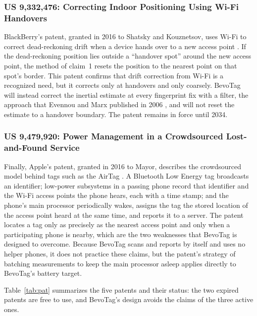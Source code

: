 \documentclass[12pt,letterpaper]{article}
\begin{document}
\subsubsection{US 9,332,476: Correcting Indoor Positioning Using Wi-Fi Handovers}
BlackBerry's patent, granted in 2016 to Shatsky and Kouznetsov, uses Wi-Fi to correct dead-reckoning 
drift when a device hands over to a new access point \cite{blackberry}. If the dead-reckoning
position lies outside a ``handover spot'' around the new access point, the method of claim~1 resets the 
position to the nearest point on that spot's border. This patent confirms that drift correction from Wi-Fi
is a recognized need, but it corrects only at handovers and only coarsely. BevoTag will instead correct
the inertial estimate at every fingerprint fix with a filter, the approach that Evennou and Marx published in
2006 \cite{evennou}, and will not reset the estimate to a handover boundary. The patent remains in
force until 2034.

\subsubsection{US 9,479,920: Power Management in a Crowdsourced Lost-and-Found Service}
Finally, Apple's patent, granted in 2016 to Mayor, describes the crowdsourced model behind tags
such as the AirTag \cite{apple}. A Bluetooth Low Energy tag broadcasts an identifier; low-power
subsystems in a passing phone record that identifier and the Wi-Fi access points the phone hears,
each with a time stamp; and the phone's main processor periodically wakes, assigns the tag the
stored location of the access point heard at the same time, and reports it to a server. The patent
locates a tag only as precisely as the nearest access point and only when a participating phone is
nearby, which are the two weaknesses that BevoTag is designed to overcome. Because BevoTag scans
and reports by itself and uses no helper phones, it does not practice these claims, but the
patent's strategy of batching measurements to keep the main processor asleep applies directly to
BevoTag's battery target.

Table~\ref{tab:pat} summarizes the five patents and their status: the two expired patents are free
to use, and BevoTag's design avoids the claims of the three active ones.
\end{document}
